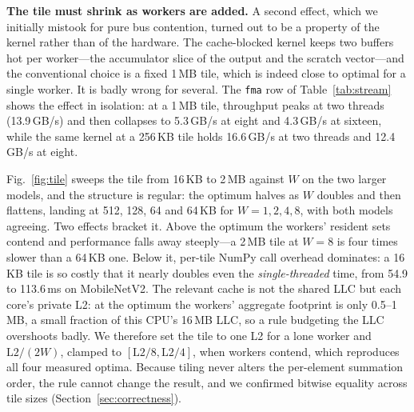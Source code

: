 \documentclass[conference]{IEEEtran}
\begin{document}
\textbf{The tile must shrink as workers are added.} A second effect, which we initially mistook for pure bus contention, turned out to be a property of the kernel rather than of the hardware. The cache-blocked kernel keeps two buffers hot per worker---the accumulator slice of the output and the scratch vector---and the conventional choice is a fixed 1\,MB tile, which is indeed close to optimal for a single worker. It is badly wrong for several. The \texttt{fma} row of Table~\ref{tab:stream} shows the effect in isolation: at a 1\,MB tile, throughput peaks at two threads (13.9\,GB/s) and then collapses to 5.3\,GB/s at eight and 4.3\,GB/s at sixteen, while the same kernel at a 256\,KB tile holds 16.6\,GB/s at two threads and 12.4\,GB/s at eight.

Fig.~\ref{fig:tile} sweeps the tile from 16\,KB to 2\,MB against $W$ on the two larger models, and the structure is regular: the optimum halves as $W$ doubles and then flattens, landing at 512, 128, 64 and 64\,KB for $W=1,2,4,8$, with both models agreeing. Two effects bracket it. Above the optimum the workers' resident sets contend and performance falls away steeply---a 2\,MB tile at $W=8$ is four times slower than a 64\,KB one. Below it, per-tile NumPy call overhead dominates: a 16\,KB tile is so costly that it nearly doubles even the \emph{single-threaded} time, from 54.9 to 113.6\,ms on MobileNetV2. The relevant cache is not the shared LLC but each core's private L2: at the optimum the workers' aggregate footprint is only 0.5--1\,MB, a small fraction of this CPU's 16\,MB LLC, so a rule budgeting the LLC overshoots badly. We therefore set the tile to one L2 for a lone worker and $\text{L2}/(2W)$, clamped to $[\text{L2}/8,\text{L2}/4]$, when workers contend, which reproduces all four measured optima. Because tiling never alters the per-element summation order, the rule cannot change the result, and we confirmed bitwise equality across tile sizes (Section~\ref{sec:correctness}).
\end{document}
